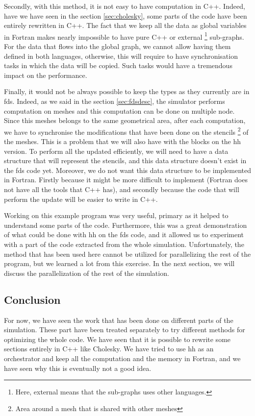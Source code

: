 Secondly, with this method, it is not easy to have computation in C++. Indeed,
have we have seen in the section \ref{sec:cholesky}, some parts of the code have
been entirely rewritten in C++. The fact that we keep all the data as global
variables in Fortran makes nearly impossible to have pure C++ or external
\footnote{Here, external means that the sub-graphs uses other languages.}
sub-graphs. For the data that flows into the global graph, we cannot allow
having them defined in both languages, otherwise, this will require to have
synchronisation tasks in which the data will be copied. Such tasks would have a
tremendous impact on the performance.

Finally, it would not be always possible to keep the types as they currently are
in \gls{fds}. Indeed, as we said in the section \ref{sec:fdsdesc}, the simulator
performs computation on meshes and this computation can be done on multiple
node. Since this meshes belongs to the same geometrical area, after each
computation, we have to synchronise the modifications that have been done on the
stencils \footnote{Area around a mesh that is shared with other meshes} of the
meshes. This is a problem that we will also have with the blocks on the \gls{hh}
version. To perform all the updated efficiently, we will need to have a data
structure that will represent the stencils, and this data structure doesn't
exist in the \gls{fds} code yet. Moreover, we do not want this data structure to
be implemented in Fortran. Firstly because it might be more difficult to
implement (Fortran does not have all the tools that C++ has), and secondly
because the code that will perform the update will be easier to write in C++.

Working on this example program was very useful, primary as it helped to
understand some parts of the code. Furthermore, this was a great demonstration
of what could be done with \gls{hh} on the \gls{fds} code, and it allowed us to
experiment with a part of the code extracted from the whole simulation.
Unfortunately, the method that has been used here cannot be utilized for
parallelizing the rest of the program, but we learned a lot from this exercise.
In the next section, we will discuss the parallelization of the rest of the
simulation.

\subsection{Conclusion}
\label{sec:fdsconcl}

For now, we have seen the work that has been done on different parts of the
simulation. These part have been treated separately to try different methods for
optimizing the whole code. We have seen that it is possible to rewrite some
sections entirely in C++ like Cholesky. We have tried to use \gls{hh} as an
orchestrator and keep all the computation and the memory in Fortran, and we have
seen why this is eventually not a good idea.

